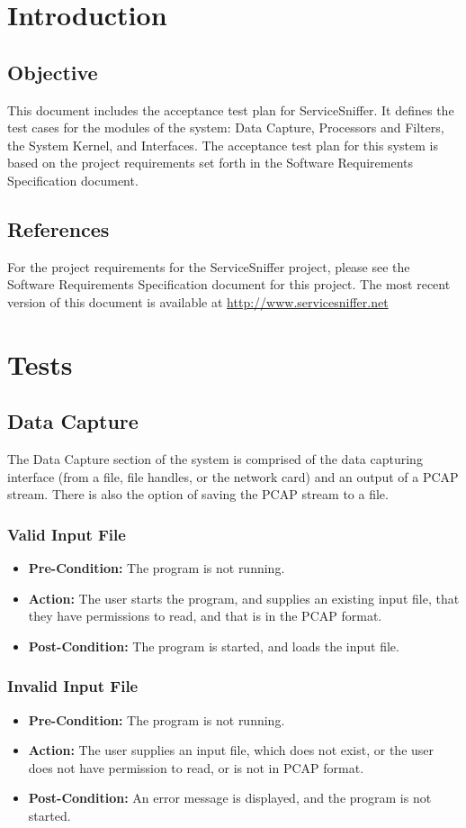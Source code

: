 \documentclass[titlepage]{article}
\newcommand{\testentry}[4]{
    \subsubsection{#1}
    \begin{itemize}
        \item \textbf{Pre-Condition:} #2
        \item \textbf{Action:} #3
        \item \textbf{Post-Condition:} #4
    \end{itemize}
    \vspace{0.5em}
}
\begin{document}

\section{Introduction}

\subsection{Objective}
    This document includes the acceptance test plan for ServiceSniffer.  It
    defines the test cases for the modules of the system:  Data Capture,
    Processors and Filters, the System Kernel, and Interfaces.  The acceptance
    test plan for this system is based on the project requirements set forth in
    the Software Requirements Specification document.

\subsection{References}
    For the project requirements for the ServiceSniffer project, please see the
    Software Requirements Specification document for this project.  The most
    recent version of this document is available at
    \url{http://www.servicesniffer.net}

\section{Tests}

\subsection{Data Capture}

The Data Capture section of the system is comprised of the data capturing
interface (from a file, file handles, or the network card) and an output of a
PCAP stream.  There is also the option of saving the PCAP stream to a file.

\testentry{Valid Input File}{
    The program is not running.
}{
    The user starts the program, and supplies an existing input file, that they
    have permissions to read, and that is in the PCAP format.
}{
    The program is started, and loads the input file.
}

\testentry{Invalid Input File}{
    The program is not running.
}{
    The user supplies an input file, which does not exist, or the user does not
    have permission to read, or is not in PCAP format.
}{
    An error message is displayed, and the program is not started.
}
\end{document}
